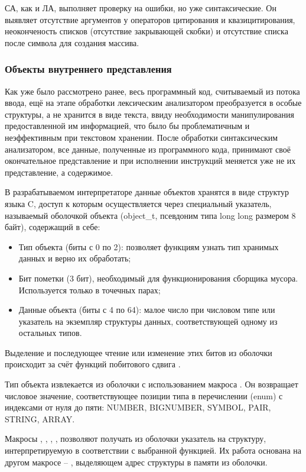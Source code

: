 СА, как и ЛА, выполняет проверку на ошибки, но уже синтаксические. Он выявляет отсутствие аргументов у операторов цитирования и квазицитирования, неоконченость списков (отсутствие закрывающей скобки) и отсутствие списка после символа \quotes{\#} для создания массива.


\subsubsection{Объекты внутреннего представления}
Как уже было рассмотрено ранее, весь программный код, считываемый из потока ввода, ещё на этапе обработки лексическим анализатором преобразуется в особые структуры, а не хранится в виде текста, ввиду необходимости манипулирования предоставленной им информацией, что было бы проблематичным и неэффективным при текстовом хранении. После обработки синтаксическим анализатором, все данные, полученные из программного кода, принимают своё окончательное представление и при исполнении инструкций меняется уже не их представление, а содержимое.

В разрабатываемом интерпретаторе данные объектов хранятся в виде структур языка C, доступ к которым осуществляется через специальный указатель, называемый оболочкой объекта (object\_t, псевдоним типа long long размером 8 байт), содержащий в себе:
\begin{itemize}
	\item Тип объекта (биты с 0 по 2): позволяет функциям узнать тип хранимых данных и верно их обработать;
	\item Бит пометки (3 бит), необходимый для функционирования сборщика мусора. Используется только в точечных парах;
	\item Данные объекта (биты с 4 по 64): малое число при числовом типе или указатель на экземпляр структуры данных, соответствующей одному из остальных типов.
\end{itemize}

Выделение и последующее чтение или изменение этих битов из оболочки происходит за счёт функций побитового сдвига \cite{e5}.

Тип объекта извлекается из оболочки с использованием макроса . Он возвращает числовое значение, соответствующее позиции типа в перечислении (enum) с индексами от нуля до пяти: NUMBER, BIGNUMBER, SYMBOL, PAIR, STRING, ARRAY.

Макросы , , , ,  позволяют получать из оболочки указатель на структуру, интерпретируемую в соответствии с выбранной функцией. Их работа основана на другом макросе -- , выделяющем адрес структуры в памяти из оболочки.

